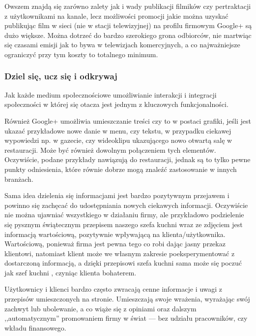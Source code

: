 Owszem znajdą się zarówno zalety jak i wady publikacji filmików czy pertraktacji z użytkownikami na kanale, lecz możliwości promocji jakie można uzyskać publikując film w sieci (nie w stacji telewizyjnej) na profilu firmowym Google+ są dużo większe. Można dotrzeć do bardzo szerokiego grona odbiorców, nie martwiąc się czasami emisji jak to bywa w telewizjach komercyjnych, a co najważniejsze ograniczyć przy tym koszty to totalnego minimum.


\subsubsection{Dziel się, ucz się i odkrywaj}
Jak każde medium społecznościowe umożliwianie interakcji i integracji społeczności w której się otacza jest jednym z kluczowych funkcjonalności. 

Również Google+ umożliwia umieszczanie treści czy to w postaci grafiki, jeśli jest ukazać przykładowe nowe danie w menu, czy tekstu, w przypadku ciekawej wypowiedzi np. w gazecie, czy wideoklipu ukazującego nowo otwartą salę w restauracji. Może być również dowolnym połączeniem tych elementów. Oczywiście, podane przykłady nawiązują do restauracji, jednak są to tylko pewne punkty odniesienia, które równie dobrze mogą znaleźć zastosowanie w innych branżach.

Sama idea dzielenia się informacjami jest bardzo pozytywnym przejawem i powinno się zachęcać do udostępniania nowych ciekawych informacji. Oczywiście nie można ujawniać wszystkiego w działaniu firmy, ale przykładowo podzielenie się pysznym świątecznym przepisem naszego szefa kuchni wraz ze zdjęciem jest informacją wartościową, pozytywnie wpływającą na klienta/użytkownika. Wartościową, ponieważ firma jest pewna tego co robi dając jasny przekaz klientowi, natomiast klient może we własnym zakresie poeksperymentować z dostarczoną informacją, a dzięki przepisowi szefa kuchni sama może się poczuć jak szef kuchni \cite[s.101]{Brogan12}, czyniąc klienta bohaterem.

Użytkownicy i klienci bardzo często zwracają cenne informacje i uwagi z przepisów umieszczonych na stronie. Umieszczają swoje wrażenia, wyrażając swój zachwyt lub ubolewanie, a co wiąże się z opiniami oraz dalszym ,,automatycznym'' promowaniem firmy w świat --- bez udziału pracowników, czy wkładu finansowego.


